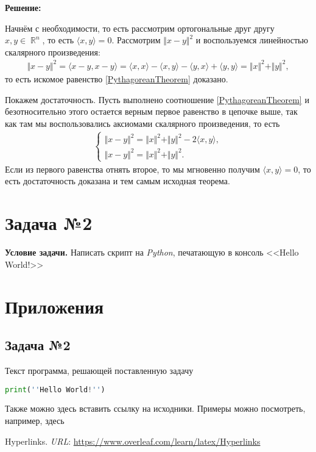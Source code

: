 \documentclass[12pt]{article}
\DeclareMathOperator{\R}{\mathbb{R}}
\begin{document}
\textbf{Решение:}

Начнём с необходимости, то есть рассмотрим ортогональные друг другу $x, y \in \R^n$, то есть $\langle x, y \rangle = 0$. Рассмотрим
$\Vert x - y \Vert^2$ и воспользуемся линейностью скалярного произведения:
\begin{gather*}
    \Vert x - y \Vert^2 = \langle x - y, x - y \rangle = \langle x, x \rangle - \langle x, y \rangle - \langle y, x \rangle + \langle y, y \rangle = \Vert x \Vert^2 + \Vert y \Vert^2,
\end{gather*}
то есть искомое равенство \eqref{PythagoreanTheorem} доказано.

Покажем достаточность. Пусть выполнено соотношение \eqref{PythagoreanTheorem} и безотносительно этого остается верным первое равенство в цепочке выше, так
как там мы воспользовались аксиомами скалярного произведения, то есть
\begin{gather*}
    \begin{cases}
        \Vert x - y \Vert^2 = \Vert x \Vert^2 + \Vert y \Vert^2 - 2\langle x, y\rangle,\\
        \Vert x - y \Vert^2 = \Vert x \Vert^2 + \Vert y \Vert^2.
    \end{cases}
\end{gather*}
Если из первого равенства отнять второе, то мы мгновенно получим $\langle x, y\rangle = 0$, то есть достаточность доказана и тем самым исходная теорема.

\section*{Задача №2}

\textbf{Условие задачи.} Написать скрипт на \textit{Python}, печатающую в консоль <<Hello World!>>


\newpage

\section*{Приложения}

\subsection*{Задача №2}

Текст программа, решающей поставленную задачу
\begin{lstlisting}[language=Python, caption=Вывод в консоль фразы <<Hello World!>>,captionpos=b]
    print(''Hello World!'')
\end{lstlisting}

Также можно здесь вставить ссылку на исходники. Примеры можно посмотреть, например, здесь \cite{OverleafHyperlinks}

\newpage
{}
\begin{thebibliography}{99}
    Hyperlinks. \textit{URL}: \href{https://www.overleaf.com/learn/latex/Hyperlinks}{https://www.overleaf.com/learn/latex/Hyperlinks}
\end{thebibliography}
\end{document}
